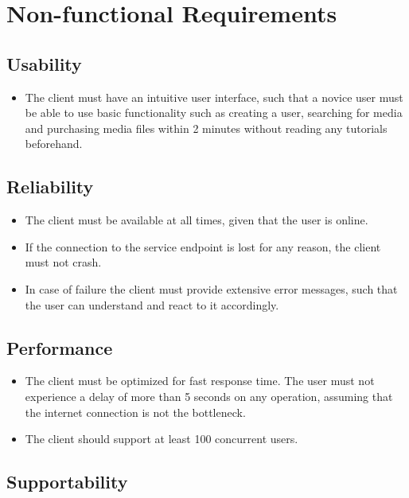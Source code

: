 \documentclass{report}
\begin{document}
\section{Non-functional Requirements}

\subsection{Usability}

\begin{itemize}
\item The client must have an intuitive user interface, such that a novice user must be able to use basic functionality such as creating a user, searching for media and purchasing media files within 2 minutes without reading any tutorials beforehand.
\end{itemize}

\subsection{Reliability}

\begin{itemize}
\item The client must be available at all times, given that the user is online. 
\item If the connection to the service endpoint is lost for any reason, the client must not crash. \item In case of failure the client must provide extensive error messages, such that the user can understand and react to it accordingly.
\end{itemize}

\subsection{Performance}

\begin{itemize}
\item The client must be optimized for fast response time. The user must not experience a delay of more than 5 seconds on any operation, assuming that the internet connection is not the bottleneck.

\item The client should support at least 100 concurrent users. 
\end{itemize}
\subsection{Supportability}
\end{document}

